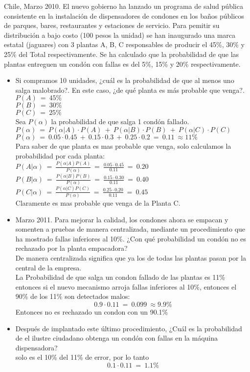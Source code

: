 Chile, Marzo 2010. El nuevo gobierno ha lanzado un programa de salud pública consistente en la instalación
de dispensadores de condones en los baños públicos de parques, bares, restaurantes y estaciones de servicio.
Para pemitir su distribución a bajo costo (100 pesos la unidad) se han inaugurado una marca estatal (jaguares)
con 3 plantas A, B, C responsables de producir el 45\%, 30\% y 25\% del Total respectivamente.
Se ha calculado que la probabilidad de que las plantas entreguen un condón con fallas es del 5\%, 15\% y 20\%
respectivamente.

\begin{itemize}
	\item Si compramos 10 unidades, ¿cuál es la probabilidad de que al menos uno salga malobrado?.
	En este caso, ¿de qué planta es más probable que venga?.\\
	$P(A)\ =\ 45\%$\\
	$P(B)\ =\ 30\%$\\
	$P(C)\ =\ 25\%$\\
	Sea $P(\alpha)$ la probabilidad de que salga 1 condón fallado.\\
	$P(\alpha)\ =\ P(\alpha|A)\cdot P(A)\ +\ P(\alpha|B)\cdot P(B)\ +\ P(\alpha|C)\cdot P(C)\ $\\
	$P(\alpha)\ =\ 0.05\cdot 0.45\ +\ 0.15\cdot 0.3\ +\ 0.25\cdot 0.2\ =\ 0.11\ \approx 11\% $\\
	Para saber de que planta es mas probable que venga, solo calculamos la probabilidad por cada planta:\\
	$P(A|\alpha)\ =\ \frac{P(\alpha|A)P(A)}{P(\alpha)}\ =\ \frac{0.05\cdot 0.45}{0.11}\ =\ 0.20 $\\
	$P(B|\alpha)\ =\ \frac{P(\alpha|B)P(B)}{P(\alpha)}\ =\ \frac{0.15\cdot 0.30}{0.11}\ =\ 0.40 $\\
	$P(C|\alpha)\ =\ \frac{P(\alpha|C)P(C)}{P(\alpha)}\ =\ \frac{0.25\cdot 0.20}{0.11}\ =\ 0.45 $\\
	Claramente es mas probable que venga de la Planta C.

  	\item Marzo 2011. Para mejorar la calidad, los condones ahora se empacan y somenten a pruebas
	de manera centralizada, mediante un procedimiento que ha mostrado fallas inferiores al 10\%.
	¿Con qué probabilidad un condón no es rechazado por la planta empacadora?\\
	De manera centralizada significa que ya los de todas las plantas pasan por la central de la empresa.\\
	La Probabilidad de que salga un condon fallado de las plantas es 11\% entonces si el nuevo mecanismo
	arroja fallas inferiores al 10\%, entonces el 90\% de los 11\% son detectados malos:
	$$0.9\cdot 0.11\ =\ 0.099\ \approx 9.9\%$$
	Entonces no es rechazado un condon con un 90.1\%

  	\item Después de implantado este último procedimiento, ¿Cuál es la probabilidad de el ilustre
	ciudadano obtenga un condón con fallas en la máquina dispensadora?\\
	solo es el 10\% del 11\% de error, por lo tanto
	$$0.1\cdot 0.11\ =\ 1.1\%$$


\end{itemize}
